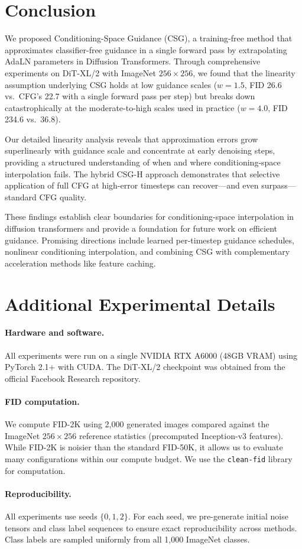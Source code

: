 \documentclass{article}
\newcommand{\adaln}{AdaLN}
\begin{document}
\section{Conclusion}
\label{sec:conclusion}

We proposed Conditioning-Space Guidance (CSG), a training-free method that approximates classifier-free guidance in a single forward pass by extrapolating \adaln{} parameters in Diffusion Transformers. Through comprehensive experiments on DiT-XL/2 with ImageNet $256\times 256$, we found that the linearity assumption underlying CSG holds at low guidance scales ($w = 1.5$, FID 26.6 vs.\ CFG's 22.7 with a single forward pass per step) but breaks down catastrophically at the moderate-to-high scales used in practice ($w = 4.0$, FID 234.6 vs.\ 36.8).

Our detailed linearity analysis reveals that approximation errors grow superlinearly with guidance scale and concentrate at early denoising steps, providing a structured understanding of when and where conditioning-space interpolation fails. The hybrid CSG-H approach demonstrates that selective application of full CFG at high-error timesteps can recover---and even surpass---standard CFG quality.

These findings establish clear boundaries for conditioning-space interpolation in diffusion transformers and provide a foundation for future work on efficient guidance. Promising directions include learned per-timestep guidance schedules, nonlinear conditioning interpolation, and combining CSG with complementary acceleration methods like feature caching.




\appendix

\section{Additional Experimental Details}
\label{app:details}

\paragraph{Hardware and software.} All experiments were run on a single NVIDIA RTX A6000 (48GB VRAM) using PyTorch 2.1+ with CUDA. The DiT-XL/2 checkpoint was obtained from the official Facebook Research repository.

\paragraph{FID computation.} We compute FID-2K using 2,000 generated images compared against the ImageNet $256\times 256$ reference statistics (precomputed Inception-v3 features). While FID-2K is noisier than the standard FID-50K, it allows us to evaluate many configurations within our compute budget. We use the \texttt{clean-fid} library for computation.

\paragraph{Reproducibility.} All experiments use seeds $\{0, 1, 2\}$. For each seed, we pre-generate initial noise tensors and class label sequences to ensure exact reproducibility across methods. Class labels are sampled uniformly from all 1,000 ImageNet classes.
\end{document}
